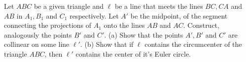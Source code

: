 Let $ABC$ be a given triangle and $\ell$ be a line that meets the lines $BC, CA$ and $AB$ in $A_1,B_1$ and $C_1$ respectively. Let $A'$ be the midpoint, of the segment connecting the projections of $A_1$ onto the lines $AB$ and $AC$. Construct, analogously the points $B'$ and $C'$.
(a) Show that the points $A', B'$ and $C'$ are collinear on some line $\ell'$.
(b) Show that if $\ell$ contains the circumcenter of the triangle $ABC$, then $\ell' $ contains the center of it's Euler circle.